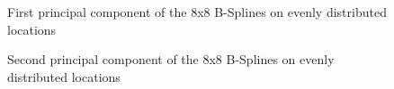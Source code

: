 \documentclass[
]{article}
\begin{document}
\begin{figure}


\caption{\label{fig-pc1-mesh}First principal component of the 8x8
B-Splines on evenly distributed locations}

\end{figure}%

\begin{figure}


\caption{\label{fig-pc2-mesh}Second principal component of the 8x8
B-Splines on evenly distributed locations}

\end{figure}%
\end{document}
